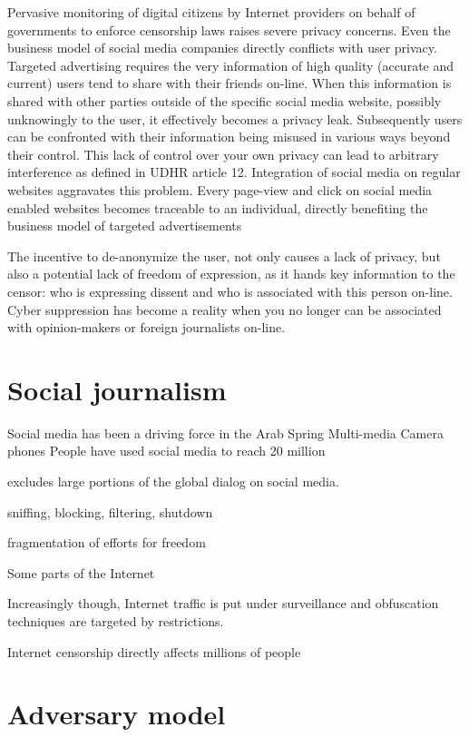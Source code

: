 Pervasive monitoring of digital citizens by Internet providers on behalf of governments to enforce censorship laws raises severe privacy concerns.
Even the business model of social media companies directly conflicts with user privacy.
Targeted advertising requires the very information of high quality (accurate and current) users tend to share with their friends on-line.
When this information is shared with other parties outside of the specific social media website, possibly unknowingly to the user, it effectively becomes a privacy leak.
Subsequently users can be confronted with their information being misused in various ways beyond their control.
This lack of control over your own privacy can lead to arbitrary interference as defined in UDHR article 12. %
Integration of social media on regular websites aggravates this problem.
Every page-view and click on social media enabled websites becomes traceable to an individual, directly benefiting the business model of targeted advertisements

The incentive to de-anonymize the user, not only causes a lack of privacy, but also a potential lack of freedom of expression, as it hands key information to the censor: who is expressing dissent and who is associated with this person on-line.
Cyber suppression has become a reality when you no longer can be associated with opinion-makers or foreign journalists on-line.

\section{Social journalism}
Social media has been a driving force in the Arab Spring 
Multi-media 
Camera phones
People have used social media to reach 20 million 


 excludes large portions of the global dialog on social media.


sniffing, blocking, filtering, shutdown


fragmentation of efforts for freedom


Some parts of the Internet

Increasingly though, Internet traffic is put under surveillance and obfuscation techniques are targeted by restrictions.

Internet censorship directly affects millions of people


\section{Adversary model}



